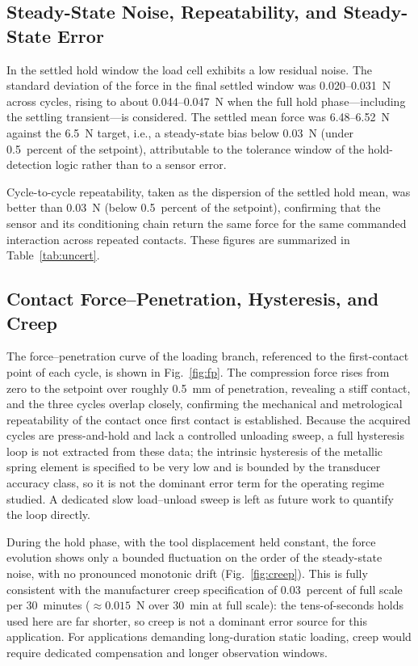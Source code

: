 \documentclass[conference]{IEEEtran}
\begin{document}
\subsection{Steady-State Noise, Repeatability, and Steady-State Error}
In the settled hold window the load cell exhibits a low residual noise. The standard deviation of the force in the final settled window was 0.020--0.031~N across cycles, rising to about 0.044--0.047~N when the full hold phase---including the settling transient---is considered. The settled mean force was 6.48--6.52~N against the 6.5~N target, i.e., a steady-state bias below 0.03~N (under 0.5~percent of the setpoint), attributable to the tolerance window of the hold-detection logic rather than to a sensor error.

Cycle-to-cycle repeatability, taken as the dispersion of the settled hold mean, was better than 0.03~N (below 0.5~percent of the setpoint), confirming that the sensor and its conditioning chain return the same force for the same commanded interaction across repeated contacts. These figures are summarized in Table~\ref{tab:uncert}.

\subsection{Contact Force--Penetration, Hysteresis, and Creep}
The force--penetration curve of the loading branch, referenced to the first-contact point of each cycle, is shown in Fig.~\ref{fig:fp}. The compression force rises from zero to the setpoint over roughly 0.5~mm of penetration, revealing a stiff contact, and the three cycles overlap closely, confirming the mechanical and metrological repeatability of the contact once first contact is established. Because the acquired cycles are press-and-hold and lack a controlled unloading sweep, a full hysteresis loop is not extracted from these data; the intrinsic hysteresis of the metallic spring element is specified to be very low and is bounded by the transducer accuracy class, so it is not the dominant error term for the operating regime studied. A dedicated slow load--unload sweep is left as future work to quantify the loop directly.

During the hold phase, with the tool displacement held constant, the force evolution shows only a bounded fluctuation on the order of the steady-state noise, with no pronounced monotonic drift (Fig.~\ref{fig:creep}). This is fully consistent with the manufacturer creep specification of 0.03~percent of full scale per 30~minutes ($\approx0.015$~N over 30~min at full scale): the tens-of-seconds holds used here are far shorter, so creep is not a dominant error source for this application. For applications demanding long-duration static loading, creep would require dedicated compensation and longer observation windows.
\end{document}
